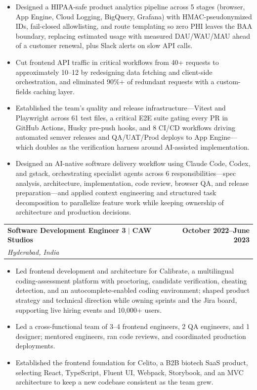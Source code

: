 \documentclass[10pt,a4paper]{article}
\makeatletter
\newcommand{\role}[4]{%
  \Needspace*{5\baselineskip}%
  \begin{tabularx}{\textwidth}{@{}Xr@{}}
    \textbf{\color{ink}#1} $\mid$ \textbf{#2} & \textbf{#3} \\
    \textit{#4} &
  \end{tabularx}\vspace{-4pt}
}
\makeatother
\begin{document}
\begin{itemize}
  \item Designed a HIPAA-safe product analytics pipeline across 5 stages (browser, App Engine, Cloud Logging, BigQuery, Grafana) with HMAC-pseudonymized IDs, fail-closed allowlisting, and route templating so zero PHI leaves the BAA boundary, replacing estimated usage with measured DAU/WAU/MAU ahead of a customer renewal, plus Slack alerts on slow API calls.
  \item Cut frontend API traffic in critical workflows from 40+ requests to approximately 10--12 by redesigning data fetching and client-side orchestration, and eliminated 90\%+ of redundant requests with a custom-fields caching layer.
  \item Established the team's quality and release infrastructure---Vitest and Playwright across 61 test files, a critical E2E suite gating every PR in GitHub Actions, Husky pre-push hooks, and 8 CI/CD workflows driving automated semver releases and QA/UAT/Prod deploys to App Engine---which doubles as the verification harness around AI-assisted implementation.
  \item Designed an AI-native software delivery workflow using Claude Code, Codex, and gstack, orchestrating specialist agents across 6 responsibilities---spec analysis, architecture, implementation, code review, browser QA, and release preparation---and applied context engineering and structured task decomposition to parallelize feature work while keeping ownership of architecture and production decisions.
\end{itemize}

\role{Software Development Engineer 3}{CAW Studios}{October 2022--June 2023}{Hyderabad, India}
\begin{itemize}
  \item Led frontend development and architecture for Calibrate, a multilingual coding-assessment platform with proctoring, candidate verification, cheating detection, and an autocomplete-enabled coding environment; shaped product strategy and technical direction while owning sprints and the Jira board, supporting live hiring events and 10,000+ users.
  \item Led a cross-functional team of 3--4 frontend engineers, 2 QA engineers, and 1 designer; mentored engineers, ran code reviews, and coordinated production deployments.
  \item Established the frontend foundation for Celito, a B2B biotech SaaS product, selecting React, TypeScript, Fluent UI, Webpack, Storybook, and an MVC architecture to keep a new codebase consistent as the team grew.
\end{itemize}
\end{document}
